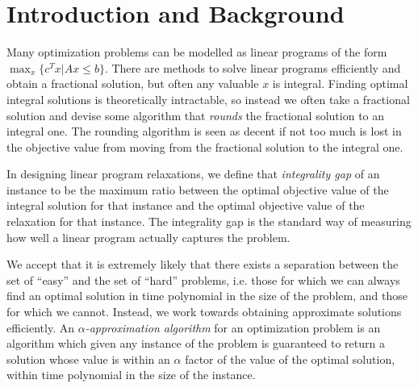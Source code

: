 \chapter{Introduction and Background}



Many optimization problems can be modelled as linear programs of the form $\max_x\{c^T x | Ax \leq b\}$.
There are methods to solve linear programs efficiently and obtain a fractional solution, 
but often any valuable $x$ is integral. 
Finding optimal integral solutions is theoretically intractable, 
so instead we often take a fractional solution and devise some algorithm that \emph{rounds} 
the fractional solution to an integral one. 
The rounding algorithm is seen as decent if not too much is lost in the objective value from moving from the fractional solution to the integral one.


In designing linear program relaxations, we define that \emph{integrality gap} of an instance
to be the maximum ratio between the optimal objective value of the integral solution for that instance and the optimal objective value of 
the relaxation for that instance.
The integrality gap is the standard way of measuring 
how well a linear program actually captures the problem. 


We accept that it is extremely likely that there exists a separation 
between the set of ``easy'' and the set of ``hard'' problems, i.e. those for which we can always find an optimal solution in time polynomial in the 
size of the problem, and those for which we cannot. 
Instead, we work towards obtaining approximate solutions efficiently. 
An \emph{$\alpha$-approximation algorithm} for an optimization problem is
an algorithm which given any instance of the problem is guaranteed to return a solution whose value is
within an $\alpha$ factor 
of the value of the optimal solution, within time polynomial in the size of the instance.

